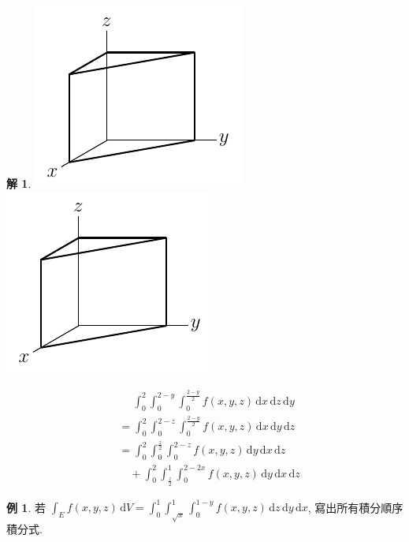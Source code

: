 \documentclass[12pt]{extarticle}
\newcommand{\ds}{\displaystyle}
\theoremstyle{definition}
\newtheorem*{ex}{例}
\newtheorem*{sol}{解}
\begin{document}
{\begin{sol}
\begin{minipage}{0.23\textwidth}
    \includegraphics[scale=0.62,page=11]{fig/text.pdf} \\
    \includegraphics[scale=0.62,page=12]{fig/text.pdf} 
  \end{minipage}
  \begin{minipage}{0.54\textwidth}
    \begin{align*}
      &\quad\;\int_0^2\!\!\int_0^{2 - y}\!\!\int_0^{\frac{2 - y}{2}}\!\!f(x, y, z)\,\text{d}x\,\text{d}z\,\text{d}y \\
      &= \int_0^2\!\!\int_0^{2 - z}\!\!\int_0^{\frac{2 - y}{2}}\!\!f(x, y, z)\,\text{d}x\,\text{d}y\,\text{d}z \\
      &= \int_0^2\!\!\int_0^{\frac{z}{2}}\!\!\int_0^{2 - z}\!\!f(x, y, z)\,\text{d}y\,\text{d}x\,\text{d}z \\
      &\quad+\int_0^2\!\!\int_{\frac{z}{2}}^{1}\!\!\int_0^{2 - 2x}\!\!f(x, y, z)\,\text{d}y\,\text{d}x\,\text{d}z
    \end{align*}
  \end{minipage}
\end{sol}

\begin{ex}
  若 $\ds\int_E f(x, y, z)\,\text{d}V = \int_0^1\!\int_{\sqrt{x}}^{1}\int_0^{1 - y}\!\!f(x, y, z)\,\text{d}z\,\text{d}y\,\text{d}x$, 寫出所有積分順序積分式.
\end{ex}

}
\end{document}
